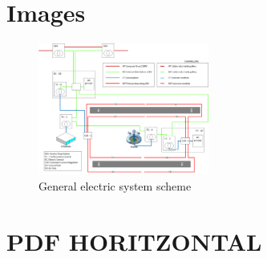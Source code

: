 \section{Images}
\begin{figure}[H]
	\centering
	\includegraphics[clip, trim=0cm 0cm 0cm 0cm, width=0.5\textwidth]{./images/electric/esquema_electrico}
	\caption{General electric system scheme}
	\label{electricScheme}
\end{figure}

\section{PDF HORITZONTAL}

